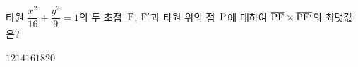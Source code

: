 타원 $\dfrac{x^2}{16}+\dfrac{y^2}{9}=1$의 두 초점~$\mathrm{F}$, $\mathrm{F}'$과 타원 위의 점~$\mathrm{P}$에 대하여 $\overline{\mathrm{PF}}\times\overline{\mathrm{PF'}}$의 최댓값은?
\begin{choices32}{$12$}{$14$}{$16$}{$18$}{$20$}\end{choices32}
